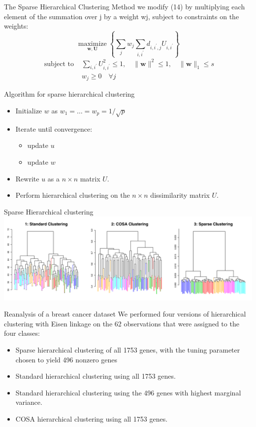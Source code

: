 \documentclass[12pt]{beamer}
\begin{document}
\begin{frame}{The Sparse Hierarchical Clustering Method}
we modify (14) by multiplying each
element of the summation over j by a weight wj, subject to constraints
on the weights:
$$
\underset{\mathbf{w}, \mathbf{U}}{\operatorname{maximize}}\left\{\sum_{j} w_{j} \sum_{i, i^{\prime}} d_{i, i^{\prime}, j} U_{i, i^{\prime}}\right\}
$$
\begin{equation}\tag{15}
\begin{array}{ll}
\text { subject to } & \sum_{i, i^{\prime}} U_{i, i^{\prime}}^{2} \leq 1, \quad\|\mathbf{w}\|^{2} \leq 1, \quad\|\mathbf{w}\|_{1} \leq s \\
& w_{j} \geq 0 \quad \forall j
\end{array}
\end{equation}
\end{frame}


\begin{frame}{Algorithm for sparse hierarchical clustering}
\begin{itemize}
\item Initialize $w$ as $w_1=\dots =w_p=1/\sqrt{p}$
\item Iterate until convergence:
\begin{itemize}
\item update $u$
\item update $w$
\end{itemize}
\item Rewrite $u$ as a $n \times n$ matrix $U$.
\item Perform hierarchical clustering on the $n \times n$ dissimilarity matrix $U$.
\end{itemize}
\end{frame}
\begin{frame}{Sparse Hierarchical clustering}
\includegraphics[scale=0.5]{fig6.png}
\end{frame}

\begin{frame}{Reanalysis of a breast cancer dataset}
We performed four versions of hierarchical
clustering with Eisen linkage on the 62 observations that were
assigned to the four classes:
\begin{itemize}
\item Sparse hierarchical clustering of all 1753 genes, with the
tuning parameter chosen to yield 496 nonzero genes
\item Standard hierarchical clustering using all 1753 genes.
\item Standard hierarchical clustering using the 496 genes with
highest marginal variance.
\item COSA hierarchical clustering using all 1753 genes.
\end{itemize}
\end{frame}
\end{document}
